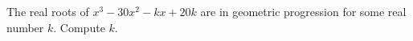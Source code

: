 The real roots of $x^3-30x^2-kx+20k$ are in geometric progression for some real number $k$. Compute $k$.
